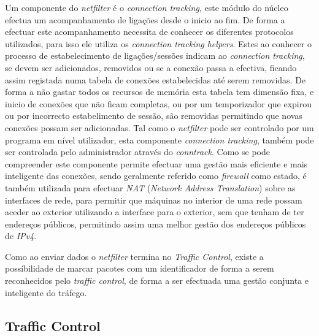 Um componente do \textit{netfilter} é o \textit{connection tracking}, este módulo do núcleo efectua um acompanhamento de ligações desde o inicio ao fim.
De forma a efectuar este acompanhamento necessita de conhecer os diferentes protocolos utilizados, para isso ele utiliza os \textit{connection tracking helpers}.
Estes ao conhecer o processo de estabelecimento de ligações/sessões indicam ao \textit{connection tracking}, se devem ser adicionados, removidos ou se a conexão passa a efectiva, ficando assim registada numa tabela de conexões estabelecidas até serem removidas.
De forma a não gastar todos os recursos de memória esta tabela tem dimensão fixa, e inicio de conexões que não ficam completas, ou por um temporizador que expirou ou por incorrecto estabelimento de sessão, são removidas permitindo que novas conexões possam ser adicionadas.
Tal como o \textit{netfilter} pode ser controlado por um programa em nível utilizador, esta componente \textit{connection tracking}, também pode ser controlada pelo administrador através do \textit{conntrack}.
Como se pode compreender este componente permite efectuar uma gestão mais eficiente e mais inteligente das conexões, sendo geralmente referido como \textit{firewall} como estado, é também utilizada para efectuar \textit{NAT} (\textit{Network Address Translation}) sobre as interfaces de rede, para permitir que máquinas no interior de uma rede possam aceder ao exterior utilizando a interface para o exterior, sem que tenham de ter endereços públicos, permitindo assim uma melhor gestão dos endereços públicos de \textit{IPv4}.

Como ao enviar dados o \textit{netfilter} termina no \textit{Traffic Control}, existe a possíbilidade de marcar pacotes com um identificador de forma a serem reconhecidos pelo \textit{traffic control}, de forma a ser efectuada uma gestão conjunta e inteligente do tráfego.

\subsection{Traffic Control}
\label{sub:traffic_control}

